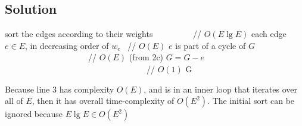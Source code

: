 \subsection*{Solution}

\begin{codebox}
\li sort the edges according to their weights \ \ \ \ \ \ \ \ \  // $O(E \lg E)$
\li \For each edge $e \in E$, in decreasing order of $w_e$ \    // $O(E)$
    \Then
    \li \If $e$ is part of a cycle of $G$  \ \ \ \ \ \ \ \ \ \ \ \ \ \ \ \ \ \ \ \    // $O(E)$ (from 2c)
        \Then
        \li $G = G - e$   \ \ \ \ \ \ \ \ \ \ \ \ \ \ \ \ \ \ \ \ \ \ \ \ \ \ \ \ \ \ \ \ \ \    // $O(1)$
        \End
    \End
\li \Return G
\end{codebox}

Because line 3 has complexity $O(E)$, and is in an inner loop that iterates over all of $E$, then it has overall time-complexity of $O(E^{2})$. The initial sort can be ignored because $E \lg E \in O(E^{2})$
